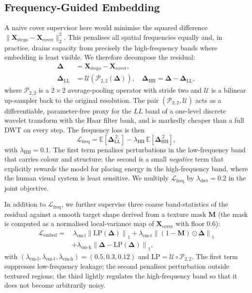 \documentclass[conference]{IEEEtran}
\begin{document}
\subsection{Frequency-Guided Embedding}
\label{sec:freq}
A naive cover supervisor here would minimise the squared difference $\|\mathbf{X}_{\text{stego}}-\mathbf{X}_{\text{cover}}\|_2^2$. This penalises all spatial frequencies equally and, in practice, drains capacity from precisely the high-frequency bands where embedding is least visible. We therefore decompose the residual:
\begin{align}
    \boldsymbol{\Delta} &= \mathbf{X}_{\text{stego}}-\mathbf{X}_{\text{cover}}, \\
    \boldsymbol{\Delta}_{\text{LL}} &= \mathcal{U}\!\left(\mathcal{P}_{2,2}(\boldsymbol{\Delta})\right), \quad
    \boldsymbol{\Delta}_{\text{HH}} = \boldsymbol{\Delta}-\boldsymbol{\Delta}_{\text{LL}},
\end{align}
where $\mathcal{P}_{2,2}$ is a $2\!\times\!2$ average-pooling operator with stride two and $\mathcal{U}$ is a bilinear up-sampler back to the original resolution. The pair $(\mathcal{P}_{2,2},\mathcal{U})$ acts as a differentiable, parameter-free proxy for the $LL$ band of a one-level discrete wavelet transform with the Haar filter bank, and is markedly cheaper than a full DWT on every step. The frequency loss is then
\begin{equation}
    \mathcal{L}_{\text{freq}} = \mathbb{E}\!\left[\boldsymbol{\Delta}_{\text{LL}}^{\,2}\right] - \lambda_{\text{HH}}\,\mathbb{E}\!\left[\boldsymbol{\Delta}_{\text{HH}}^{\,2}\right],
    \label{eq:freq}
\end{equation}
with $\lambda_{\text{HH}}\!=\!0.1$. The first term penalises perturbations in the low-frequency band that carries colour and structure; the second is a small \emph{negative} term that explicitly rewards the model for placing energy in the high-frequency band, where the human visual system is least sensitive. We multiply $\mathcal{L}_{\text{freq}}$ by $\lambda_{\text{dwt}}\!=\!0.2$ in the joint objective.

In addition to $\mathcal{L}_{\text{freq}}$, we further supervise three coarse band-statistics of the residual against a smooth target shape derived from a texture mask $\mathbf{M}$ (the mask is computed as a normalised local-variance map of $\mathbf{X}_{\text{cover}}$ with floor $0.6$):
\begin{align}
    \mathcal{L}_{\text{embed}} = & \,\lambda_{\text{em-l}}\!\left\|\mathrm{LP}(\boldsymbol{\Delta})\right\|_1
    + \lambda_{\text{em-t}}\!\left\|(1-\mathbf{M})\odot\boldsymbol{\Delta}\right\|_1 \nonumber\\
    & + \lambda_{\text{em-h}}\!\left\|\boldsymbol{\Delta}-\mathrm{LP}(\boldsymbol{\Delta})\right\|_1,
    \label{eq:embed}
\end{align}
with $(\lambda_{\text{em-l}},\lambda_{\text{em-t}},\lambda_{\text{em-h}})=(0.5,0.3,0.12)$ and $\mathrm{LP}=\mathcal{U}\circ\mathcal{P}_{2,2}$. The first term suppresses low-frequency leakage; the second penalises perturbation outside textured regions; the third lightly regulates the high-frequency band so that it does not become arbitrarily noisy.
\end{document}
